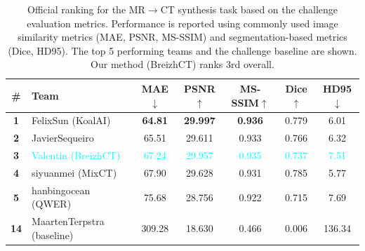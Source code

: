 \documentclass[lettersize,journal]{IEEEtran}
\begin{document}
\begin{table}[h!]
\centering
\scriptsize
\renewcommand{\arraystretch}{1}
\setlength{\tabcolsep}{5pt}
\caption{
Official ranking for the MR$\rightarrow$CT synthesis task based on the challenge evaluation metrics. Performance is reported using commonly used image similarity metrics (MAE, PSNR, MS-SSIM) and segmentation-based metrics (Dice, HD95). The top 5 performing teams and the challenge baseline are shown. Our method (BreizhCT) ranks 3rd overall.
}
\label{tab:mrct_image}
\begin{tabular}{clccccc}
\toprule
\textbf{\#} & \textbf{Team} & \textbf{MAE$\downarrow$} & \textbf{PSNR$\uparrow$} & \textbf{MS-SSIM$\uparrow$} & \textbf{Dice$\uparrow$} & \textbf{HD95$\downarrow$} \\
\midrule
\textbf{1} & FelixSun (KoalAI)      & \textbf{64.81}  & \textbf{29.997} & \textbf{0.936} & 0.779 & 6.01 \\
\textbf{2} & JavierSequeiro         & 65.51  & 29.611 & 0.933 & 0.766 & 6.32 \\
\textbf{3} & \textcolor{cyan}{Valentin (BreizhCT)} & \textcolor{cyan}{67.24}  & \textcolor{cyan}{29.957} & \textcolor{cyan}{0.935} & \textcolor{cyan}{0.737} & \textcolor{cyan}{7.51} \\
\textbf{4} & siyuanmei (MixCT)      & 67.90  & 29.628 & 0.931 & 0.785 & 5.77 \\
\textbf{5} & hanbingocean (QWER)    & 75.68  & 28.756 & 0.922 & 0.715 & 7.69 \\
\midrule
\textbf{14} & MaartenTerpstra (baseline) & 309.28 & 18.630 & 0.466 & 0.006 & 136.34 \\
\bottomrule
\end{tabular}

\end{table}
\end{document}
